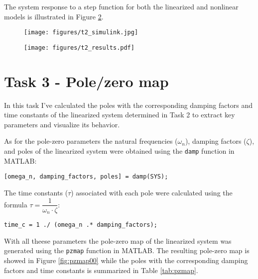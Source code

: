 \documentclass[12pt]{article}
\begin{document}
\noindent The system response to a step function for both the linearized and nonlinear models is illustrated in Figure \ref{fig:task2}.
\newpage

\begin{figure}[ht!]
  \begin{center}
  \texttt{[image: figures/t2\_simulink.jpg]}
  \label{fig:task2}
  \end{center}
\end{figure}

\begin{figure}[ht!]
  \begin{center}
  \texttt{[image: figures/t2\_results.pdf]}
  \label{fig:task2}
  \end{center}
\end{figure}

\section*{Task 3 - Pole/zero map}
In this task I've calculated the poles with the corresponding damping factors and time constants of the linearized system determined in Task 2 to extract key parameters and visualize its behavior.
\medskip

\noindent As for the pole-zero parameters the natural frequencies ($\omega_n$), damping factors ($\zeta$), and poles of the linearized system were obtained using the \texttt{damp} function in MATLAB:

\begin{verbatim}
[omega_n, damping_factors, poles] = damp(SYS);
\end{verbatim}

\noindent The time constants ($\tau$) associated with each pole were calculated using the formula $\tau = \dfrac{1}{{\omega_n \cdot \zeta}}$:

\begin{verbatim}
time_c = 1 ./ (omega_n .* damping_factors);
\end{verbatim}

\noindent  With all theese parameters the pole-zero map of the linearized system was generated using the \texttt{pzmap} function in MATLAB. The resulting pole-zero map is showed in Figure \ref{fig:pzmap00} while the poles with the corresponding damping factors and time constants is summarized in Table \ref{tab:pzmap}.
\end{document}
